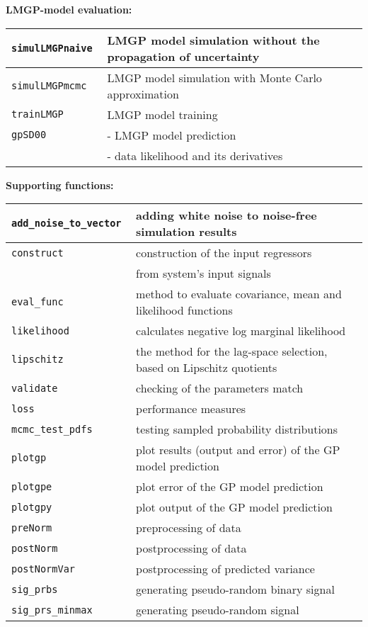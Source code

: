 \documentclass[12pt,twoside]{article}
\newcommand{\fun}[1]{\tt #1}
\begin{document}
{\pagebreak
\textbf{LMGP-model evaluation:} \\
\begin{tabular}{|l|l|}
  \hline \fun{simulLMGPnaive} & LMGP model simulation without the propagation of uncertainty \\
 \hline \fun{simulLMGPmcmc} & LMGP model simulation with Monte Carlo approximation\\
  \hline \fun{trainLMGP} & LMGP model training \\
  \hline \fun{gpSD00} & - LMGP model prediction \\
  & - data likelihood and its derivatives \\
\hline
\end{tabular}

\textbf{Supporting functions:}\\
\begin{tabular}{|l|l|}
 \hline \fun{add\_noise\_to\_vector} & adding white noise to noise-free simulation results\\
 \hline \fun{construct} & construction of the input regressors\\
  & from system's input signals\\
 \hline \fun{eval\_func} & method to evaluate covariance, mean and likelihood functions\\
 \hline \fun{likelihood} & calculates negative log marginal likelihood\\
 \hline \fun{lipschitz} & the method for the lag-space selection, based on Lipschitz quotients\\
 \hline \fun{validate} & checking of the parameters match \\
 \hline \fun{loss} & performance measures \\
 \hline \fun{mcmc\_test\_pdfs} & testing sampled probability distributions\\
 \hline \fun{plotgp} & plot results (output and error) of the GP model prediction \\
 \hline \fun{plotgpe} & plot error of the GP model prediction \\
 \hline \fun{plotgpy} & plot output of the GP model prediction \\
 \hline \fun{preNorm} & preprocessing of data \\
 \hline \fun{postNorm} & postprocessing of data \\
 \hline \fun{postNormVar} & postprocessing of predicted variance\\
 \hline \fun{sig\_prbs} & generating pseudo-random binary signal \\
 \hline \fun{sig\_prs\_minmax} & generating pseudo-random signal \\ \hline
\end{tabular}



}
\end{document}
